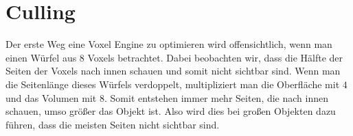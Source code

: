 \newcommand{\minipagespace}[1]{
	\begin{minipage}[c]{#1\textwidth}
		\ 
	\end{minipage}
}

\section{Culling}

Der erste Weg eine Voxel Engine zu optimieren wird
offensichtlich, wenn man einen Würfel aus $8$
Voxels betrachtet. Dabei beobachten wir, dass
die Hälfte der Seiten der Voxels nach innen schauen
und somit nicht sichtbar sind. Wenn man die
Seitenlänge dieses Würfels verdoppelt, multipliziert
man die Oberfläche mit $4$ und das Volumen mit $8$.
Somit entstehen immer mehr Seiten, die nach innen
schauen, umso größer das Objekt ist. Also wird
dies bei großen Objekten dazu führen, dass die
meisten Seiten nicht sichtbar sind.

